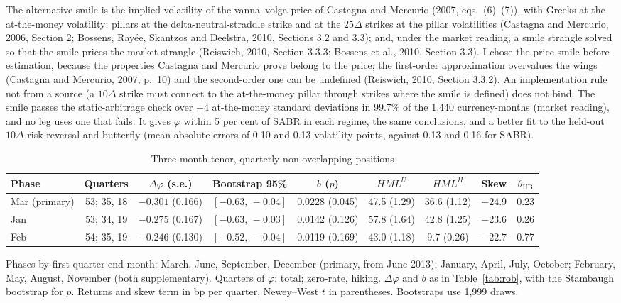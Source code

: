 \documentclass[11pt]{article}
\theoremstyle{result}
\newcommand{\HML}{\mathit{HML}}
\newcommand{\thUB}{\theta_{\mathrm{UB}}}
\newcommand{\D}{\Delta}
\begin{document}
The alternative smile is the implied volatility of the vanna--volga price of Castagna and Mercurio (2007, eqs.~(6)--(7)), with Greeks at the at-the-money volatility; pillars at the delta-neutral-straddle strike and at the $25\D$ strikes at the pillar volatilities (Castagna and Mercurio, 2006, Section 2; Bossens, Ray\'ee, Skantzos and Deelstra, 2010, Sections 3.2 and 3.3); and, under the market reading, a smile strangle solved so that the smile prices the market strangle (Reiswich, 2010, Section 3.3.3; Bossens et al., 2010, Section 3.3). I chose the price smile before estimation, because the properties Castagna and Mercurio prove belong to the price; the first-order approximation overvalues the wings (Castagna and Mercurio, 2007, p.~10) and the second-order one can be undefined (Reiswich, 2010, Section 3.3.2). An implementation rule not from a source (a $10\D$ strike must connect to the at-the-money pillar through strikes where the smile is defined) does not bind. The smile passes the static-arbitrage check over $\pm4$ at-the-money standard deviations in 99.7\% of the 1,440 currency-months (market reading), and no leg uses one that fails. It gives $\varphi$ within 5 per cent of SABR in each regime, the same conclusions, and a better fit to the held-out $10\D$ risk reversal and butterfly (mean absolute errors of 0.10 and 0.13 volatility points, against 0.13 and 0.16 for SABR).

\begin{table}[t]
\centering\footnotesize
\setlength{\tabcolsep}{3pt}
\caption{Three-month tenor, quarterly non-overlapping positions}\label{tab:3m}
\begin{tabular}{lcccccccc}
\toprule
Phase & Quarters & $\D\varphi$ (s.e.) & Bootstrap 95\% & $b$ ($p$) & $\HML^U$ & $\HML^H$ & Skew & $\thUB$ \\
\midrule
Mar (primary) & 53; 35, 18 & $-0.301$ (0.166) & $[-0.63,\,-0.04]$ & 0.0228 (0.045) & 47.5 (1.29) & 36.6 (1.12) & $-24.9$ & 0.23 \\
Jan & 53; 34, 19 & $-0.275$ (0.167) & $[-0.63,\,-0.03]$ & 0.0142 (0.126) & 57.8 (1.64) & 42.8 (1.25) & $-23.6$ & 0.26 \\
Feb & 54; 35, 19 & $-0.246$ (0.130) & $[-0.52,\,-0.04]$ & 0.0119 (0.169) & 43.0 (1.18) & 9.7 (0.26) & $-22.7$ & 0.77 \\
\bottomrule
\end{tabular}
\par\medskip
\begin{minipage}{0.97\linewidth}
Phases by first quarter-end month: March, June, September, December (primary, from June 2013); January, April, July, October; February, May, August, November (both supplementary). Quarters of $\varphi$: total; zero-rate, hiking. $\D\varphi$ and $b$ as in Table~\ref{tab:rob}, with the Stambaugh bootstrap for $p$. Returns and skew term in bp per quarter, Newey--West $t$ in parentheses. Bootstraps use 1,999 draws.
\end{minipage}
\end{table}
\end{document}
